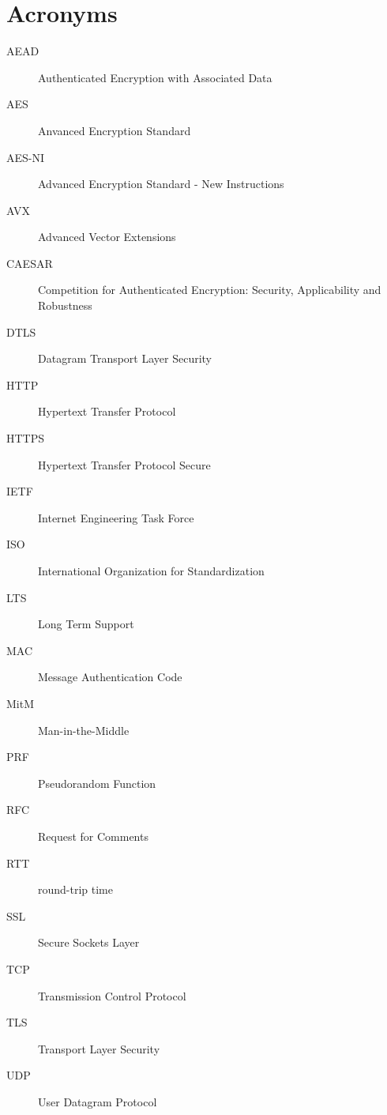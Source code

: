 \chapter{Acronyms}

\begin{description}
  \item[AEAD] Authenticated Encryption with Associated Data
  \item[AES] Anvanced Encryption Standard
  \item[AES-NI] Advanced Encryption Standard - New Instructions
  \item[AVX] Advanced Vector Extensions
  \item[CAESAR] Competition for Authenticated Encryption: Security, Applicability and Robustness
  \item[DTLS] Datagram Transport Layer Security
  \item[HTTP] Hypertext Transfer Protocol
  \item[HTTPS] Hypertext Transfer Protocol Secure
  \item[IETF] Internet Engineering Task Force
  \item[ISO] International Organization for Standardization
  \item[LTS] Long Term Support
  \item[MAC] Message Authentication Code
  \item[MitM] Man-in-the-Middle
  \item[PRF] Pseudorandom Function
  \item[RFC] Request for Comments
  \item[RTT] round-trip time
  \item[SSL] Secure Sockets Layer
  \item[TCP] Transmission Control Protocol
  \item[TLS] Transport Layer Security
  \item[UDP] User Datagram Protocol
\end{description}
